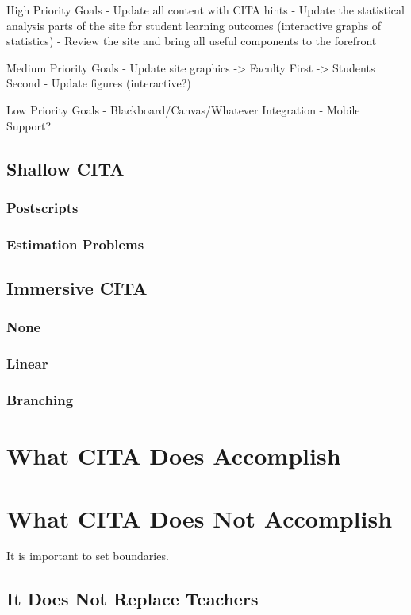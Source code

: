 High Priority Goals
- Update all content with CITA hints
- Update the statistical analysis parts of the site for student learning outcomes (interactive graphs of statistics)
- Review the site and bring all useful components to the forefront

Medium Priority Goals
- Update site graphics
-> Faculty First
-> Students Second
- Update figures (interactive?)

Low Priority Goals
- Blackboard/Canvas/Whatever Integration
- Mobile Support?

\subsection{Shallow CITA}
\subsubsection{Postscripts}
\subsubsection{Estimation Problems}

\subsection{Immersive CITA}
\subsubsection{None}
\subsubsection{Linear}
\subsubsection{Branching}

\section{What CITA Does Accomplish}

\section{What CITA Does Not Accomplish}

It is important to set boundaries.

\subsection{It Does Not Replace Teachers}

